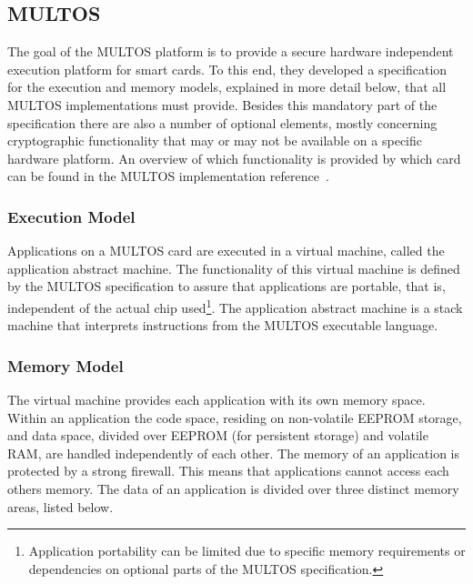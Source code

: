 \subsection{MULTOS}\label{sec:multos}

The goal of the MULTOS platform is to provide a secure hardware independent
execution platform for smart cards. To this end, they developed a specification
for the execution and memory models, explained in more detail below, that all
MULTOS implementations must provide. Besides this mandatory part of the
specification there are also a number of optional elements, mostly concerning
cryptographic functionality that may or may not be available on a specific
hardware platform. An overview of which functionality is provided by which card
can be found in the MULTOS implementation reference~\cite{MIR2012}.

\subsubsection{Execution Model}

Applications on a MULTOS card are executed in a virtual machine, called the application abstract machine. The functionality of this
virtual machine is defined by the MULTOS specification to assure that
applications are portable, that is, independent of the actual chip
used\footnote{Application portability can be limited due to specific memory
requirements or dependencies on optional parts of the MULTOS specification.}.
The application abstract machine is a stack machine that
interprets instructions from the MULTOS executable language.

\subsubsection{Memory Model}

The virtual machine provides each application with its own memory space. Within
an application the code space, residing on non-volatile EEPROM
 storage, and data space, divided over
EEPROM (for persistent storage) and volatile RAM, are handled independently of each other. The memory of an
application is protected by a strong firewall. This means that applications
cannot access each others memory. The data of an application is divided over
three distinct memory areas, listed below.

